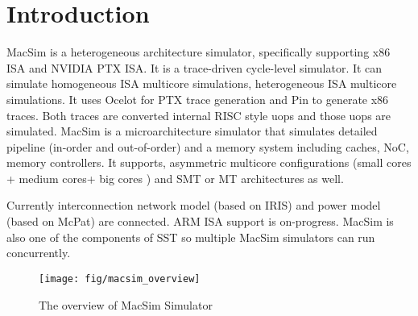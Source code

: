 
\section{Introduction}

MacSim is a heterogeneous architecture simulator, specifically supporting x86 ISA and NVIDIA PTX ISA. It is a trace-driven cycle-level simulator.  It can simulate homogeneous ISA multicore simulations, heterogeneous ISA multicore simulations. It uses Ocelot for PTX trace generation and Pin to generate x86 traces. Both traces are converted internal RISC style uops and those uops are simulated. MacSim is a microarchitecture simulator that simulates detailed pipeline (in-order and out-of-order) and a memory system including caches, NoC, memory controllers. It supports, asymmetric multicore configurations (small cores + medium cores+ big cores ) and SMT or MT architectures as well. 

Currently interconnection network model (based on IRIS) and power model (based on McPat) are connected. ARM ISA support is on-progress. MacSim is also one of the components of SST so multiple MacSim simulators can run concurrently. 

\begin{figure*}[htb]
\centering
\texttt{[image: fig/macsim\_overview]}
\caption{The overview of MacSim Simulator}
\label{fig:overview}
\end{figure*}



